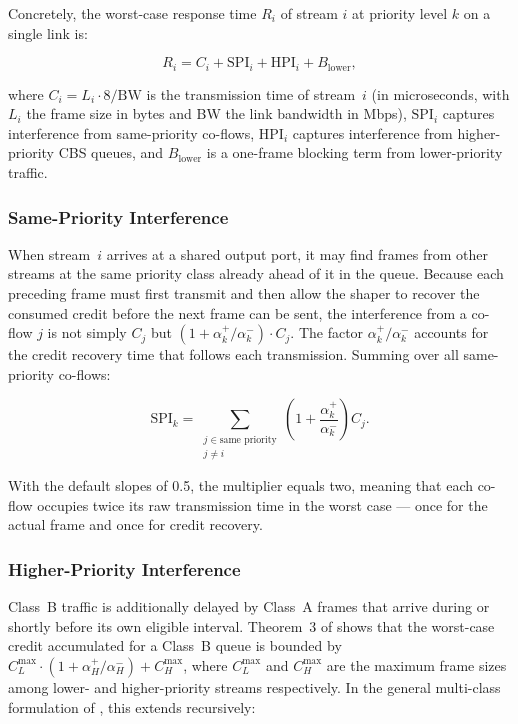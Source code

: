 \documentclass[11pt,a4paper]{article}
\begin{document}
Concretely, the worst-case response time $R_i$ of stream $i$ at priority
level $k$ on a single link is:

\begin{equation}
R_i = C_i + \mathrm{SPI}_i + \mathrm{HPI}_i + B_{\mathrm{lower}},
\label{eq:wcrt}
\end{equation}

where $C_i = L_i \cdot 8 / \mathrm{BW}$ is the transmission time of stream~$i$
(in microseconds, with $L_i$ the frame size in bytes and BW the link
bandwidth in Mbps), $\mathrm{SPI}_i$ captures interference from
same-priority co-flows, $\mathrm{HPI}_i$ captures interference from
higher-priority CBS queues, and $B_{\mathrm{lower}}$ is a one-frame
blocking term from lower-priority traffic.

\subsubsection{Same-Priority Interference}

When stream~$i$ arrives at a shared output port, it may find frames from
other streams at the same priority class already ahead of it in the queue.
Because each preceding frame must first transmit and then allow the shaper
to recover the consumed credit before the next frame can be sent, the
interference from a co-flow $j$ is not simply $C_j$ but
$(1 + \alpha_k^+/\alpha_k^-) \cdot C_j$.
The factor $\alpha_k^+/\alpha_k^-$ accounts for the credit recovery time
that follows each transmission.
Summing over all same-priority co-flows:

\begin{equation}
\mathrm{SPI}_k = \sum_{\substack{j \in \text{same priority} \\ j \neq i}}
\!\left(1 + \frac{\alpha_k^+}{\alpha_k^-}\right) C_j.
\label{eq:spi}
\end{equation}

With the default slopes of 0.5, the multiplier equals two, meaning that
each co-flow occupies twice its raw transmission time in the worst case
--- once for the actual frame and once for credit recovery.

\subsubsection{Higher-Priority Interference}

Class~B traffic is additionally delayed by Class~A frames that arrive during
or shortly before its own eligible interval.
Theorem~3 of \cite{Cao2016} shows that the worst-case credit accumulated
for a Class~B queue is bounded by $C^{\max}_L \cdot (1 + \alpha_H^+/\alpha_H^-)
+ C^{\max}_H$, where $C^{\max}_L$ and $C^{\max}_H$ are the maximum frame
sizes among lower- and higher-priority streams respectively.
In the general multi-class formulation of \cite{Cao2018}, this extends
recursively:
\end{document}
